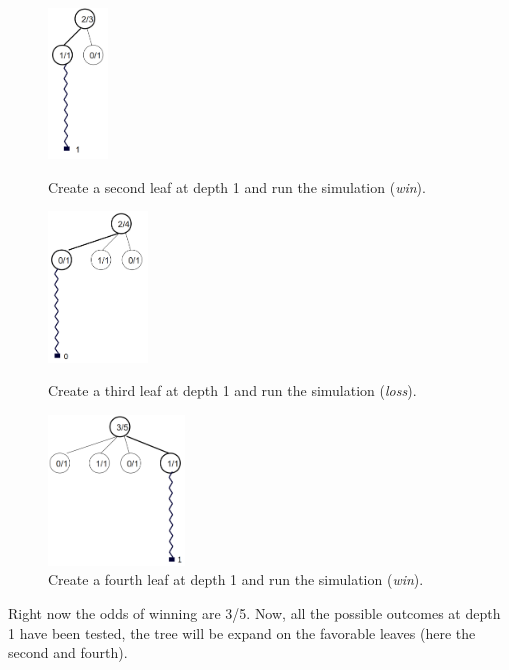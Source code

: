 \begin{figure}[H]
\centering
	\begin{minipage}[b]{0.3\linewidth}
		\centering
		\includegraphics[height=4cm]{3Algorithms/3.2Algorithm_MCTS_Benoit/img/3.png}
		\caption{\label{fig:3}Create a second leaf at depth 1 and run the simulation (\textit{win}).}
	\end{minipage}%
	\hspace*{1cm}
	\begin{minipage}[b]{0.3\linewidth}
		\centering
		\includegraphics[height=4cm]{3Algorithms/3.2Algorithm_MCTS_Benoit/img/4.png}
		\caption{\label{fig:4}Create a third leaf at depth 1 and run the simulation (\textit{loss}).}
	\end{minipage}%
	\hspace*{1cm}
	\begin{minipage}[b]{0.3\linewidth}
		\centering
		\includegraphics[height=4cm]{3Algorithms/3.2Algorithm_MCTS_Benoit/img/5.png}
		\caption{\label{fig:5}Create a fourth leaf at depth 1 and run the simulation (\textit{win}).}
	\end{minipage}%
\end{figure}

Right now the odds of winning are 3/5. Now,  all the possible outcomes at depth 1 have been tested, the tree will be expand on the favorable leaves (here the second and fourth).

